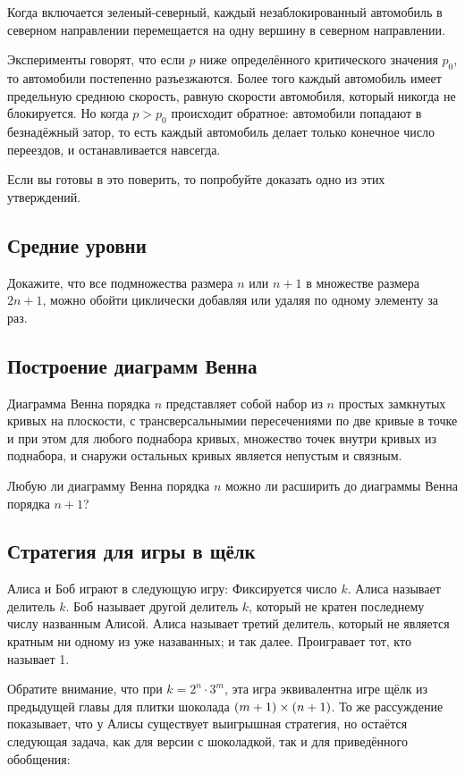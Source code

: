 Когда включается зеленый-северный, каждый незаблокированный автомобиль в северном направлении перемещается на одну вершину в северном направлении.

Эксперименты говорят, что если $p$ ниже определённого критического значения $p_0$,
то автомобили постепенно разъезжаются.
Более того каждый автомобиль имеет предельную среднюю скорость, равную скорости автомобиля, который никогда не блокируется.
Но когда $p> p_0$ происходит обратное: автомобили попадают в безнадёжный затор, то есть каждый автомобиль делает только конечное число переездов, и останавливается навсегда.

Если вы готовы в это поверить, то попробуйте доказать одно из этих утверждений.

\subsection*{Средние уровни}

Докажите, что все подмножества размера $n$ или $n+1$ в множестве размера $2n+1$, можно обойти циклически добавляя или удаляя по одному элементу за раз.

\subsection*{Построение диаграмм Венна}

Диаграмма Венна порядка $n$ представляет собой набор из $n$ простых замкнутых кривых на плоскости, с трансверсальнымии пересечениями  по две кривые в точке и при этом для любого поднабора кривых, множество точек внутри кривых из поднабора, и снаружи остальных кривых является непустым и связным.

Любую ли диаграмму Венна порядка $n$ можно ли расширить до диаграммы Венна порядка $n+1$?

\subsection*{Стратегия для игры в щёлк}

Алиса и Боб играют в следующую игру:
Фиксируется число $k$.
Алиса называет делитель $k$.
Боб называет другой делитель $k$, который не кратен последнему числу названным Алисой.
Алиса называет третий делитель, который не является кратным ни одному из уже назаванных; 
и так далее.
Проигравает тот, кто называет 1.

Обратите внимание, что при $k=2^{n}\cdot 3^{m}$, эта игра эквивалентна игре щёлк из предыдущей главы для плитки шоколада $(m+1)\z\times (n+1)$.
То же рассуждение показывает, что у Алисы существует выигрышная стратегия, но остаётся следующая задача, как для версии с шоколадкой, так и для приведённого обобщения:

